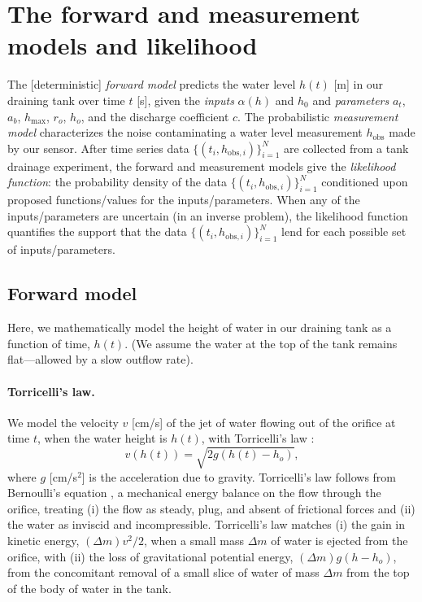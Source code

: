 \documentclass[openacc]{rsproca_new}%
\newcommand\thedata {$\{(t_i,h_{\text{obs}, i})\}_{i=1}^{N}$\xspace}
\begin{document}
\section{The forward and measurement models and likelihood} \label{sec:forward_model}
The [deterministic] \emph{forward model} predicts the water level $h(t)$ [m] in our draining tank over time $t$ [s], given the \emph{inputs} $\alpha(h)$ and $h_0$ and \emph{parameters} $a_t$, $a_b$, $h_{\text{max}}$, $r_o$, $h_o$, and the discharge coefficient $c$. 
The probabilistic \emph{measurement model} characterizes the noise contaminating a water level measurement $h_{\text{obs}}$ made by our sensor.
After time series data \thedata are collected from a tank drainage experiment, the forward and measurement models give the \emph{likelihood function}: the probability density of the data \thedata conditioned upon proposed functions/values for the inputs/parameters. 
When any of the inputs/parameters are uncertain (in an inverse problem), the likelihood function quantifies the support that the data \thedata lend for each possible set of inputs/parameters.

\subsection{Forward model}
Here, we mathematically model the height of water in our draining tank as a function of time, $h(t)$. (We assume the water at the top of the tank remains flat---allowed by a slow outflow rate). 


\paragraph{Torricelli's law.}
We model the velocity $v$ [cm/s] of the jet of water flowing out of the orifice at time $t$, when the water height is $h(t)$, with Torricelli's law \cite{d2021torricelli}:
\begin{equation}
	v(h(t)) =  \sqrt{2 g(h(t)-h_o)}, \label{eq:Torricelli}
\end{equation} where $g$ [cm/s$^2$] is the acceleration due to gravity. Torricelli's law follows from Bernoulli's equation \cite{welty2020fundamentals}, a mechanical energy balance on the flow through the orifice, treating (i) the flow as steady, plug, and absent of frictional forces and (ii) the water as inviscid and incompressible.
Torricelli's law matches (i) the gain in kinetic energy, $(\Delta m) v^2/2$, when a small mass $\Delta m$ of water is ejected from the orifice, with (ii) the loss of gravitational potential energy, $(\Delta m)g(h-h_o)$, from the concomitant removal of a small slice of water of mass $\Delta m$ from the top of the body of water in the tank. \cite{groetsch1993inverse,driver1998torricelli,williams2021vessel}
\end{document}
